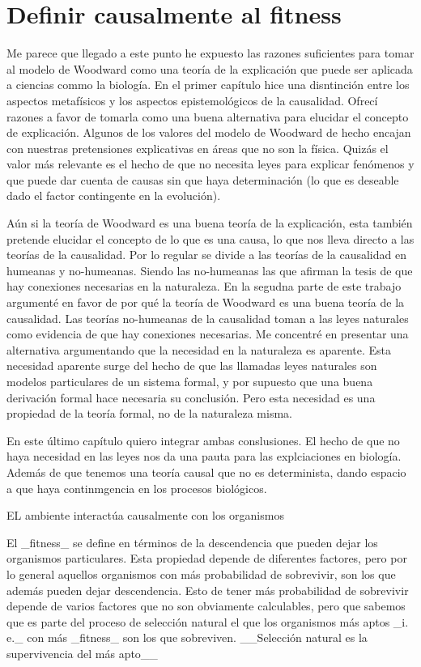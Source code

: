 \chapter{Definir causalmente al fitness}

Me parece que llegado a este punto he expuesto las razones suficientes para tomar al modelo de  Woodward como una teoría de la explicación que puede ser aplicada a ciencias commo la biología. En el primer capítulo hice una disntinción entre los aspectos metafísicos y los aspectos epistemológicos de la causalidad.  Ofrecí razones a  favor de tomarla como una buena alternativa para elucidar el concepto de explicación. Algunos de los valores del modelo de Woodward de hecho encajan con nuestras pretensiones explicativas en áreas que no son la física. Quizás el valor más relevante es el hecho de que no necesita leyes para explicar fenómenos y que puede dar cuenta de causas sin que haya determinación (lo que es deseable dado el factor contingente en la evolución).

Aún si la teoría de Woodward es una buena teoría de la explicación, esta también pretende elucidar el concepto de lo que es una causa, lo que nos lleva directo a las teorías de la causalidad. Por lo regular se divide a las teorías de la causalidad en humeanas y no-humeanas. Siendo las no-humeanas las que afirman la tesis de que hay conexiones necesarias en la naturaleza. En la segudna parte de este trabajo argumenté en favor de por qué la teoría de Woodward es una buena teoría de la causalidad. Las teorías no-humeanas de la causalidad toman a las leyes naturales como evidencia de que hay conexiones necesarias. Me concentré en presentar una alternativa argumentando que la necesidad en la naturaleza es aparente. Esta necesidad aparente surge del hecho de que las llamadas leyes naturales son modelos particulares de un sistema formal, y por supuesto que una buena derivación formal hace necesaria su conclusión. Pero esta necesidad es una propiedad de la teoría formal, no de la naturaleza misma.

En este último capítulo quiero integrar ambas conslusiones. El hecho de que no haya necesidad en las leyes nos da una pauta para las explciaciones en biología. Además de que tenemos una teoría causal que no es determinista, dando espacio a que haya continmgencia en los procesos biológicos.



 EL ambiente interactúa causalmente con los organismos

El _fitness_ se define en términos de la descendencia que pueden dejar los organismos particulares. Esta propiedad depende de diferentes factores, pero por lo general aquellos organismos con más probabilidad de sobrevivir, son los que además pueden dejar descendencia. Esto de tener más probabilidad de sobrevivir depende de varios factores que no son obviamente calculables, pero que sabemos que es parte del proceso de selección natural el que los organismos más aptos _i. e._ con más _fitness_ son los que sobreviven. __Selección natural es la supervivencia del más apto__

